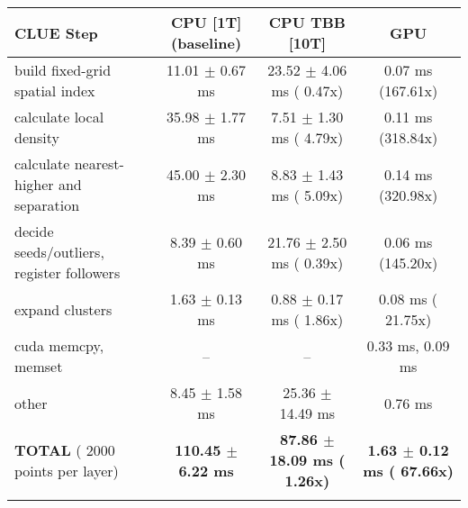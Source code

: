     \begin{tabular}{l|c|c|c}
    \hline
    CLUE Step                                 & CPU [1T] (baseline)         & CPU TBB [10T]                         & GPU                       \\ \hline
    build fixed-grid spatial index            &  11.01 $\pm$  0.67 ms       &  23.52 $\pm$  4.06 ms ( 0.47x)        &   0.07 ms (167.61x)       \\
    calculate local density                   &  35.98 $\pm$  1.77 ms       &   7.51 $\pm$  1.30 ms ( 4.79x)        &   0.11 ms (318.84x)       \\
    calculate nearest-higher and separation   &  45.00 $\pm$  2.30 ms       &   8.83 $\pm$  1.43 ms ( 5.09x)        &   0.14 ms (320.98x)       \\
    decide seeds/outliers, register followers &   8.39 $\pm$  0.60 ms       &  21.76 $\pm$  2.50 ms ( 0.39x)        &   0.06 ms (145.20x)       \\
    expand clusters                           &   1.63 $\pm$  0.13 ms       &   0.88 $\pm$  0.17 ms ( 1.86x)        &   0.08 ms ( 21.75x)       \\ \hline
    cuda memcpy, memset                       & --                          & --                                    &   0.33 ms,   0.09 ms      \\ 
    other                                     &   8.45 $\pm$  1.58 ms       &  25.36 $\pm$ 14.49 ms                 &   0.76 ms                 \\ \hline
    \textbf{TOTAL} ( 2000 points per layer)   & \textbf{110.45 $\pm$  6.22 ms} & \textbf{ 87.86 $\pm$ 18.09 ms ( 1.26x)} & \textbf{  1.63 $\pm$  0.12 ms ( 67.66x)}  \\
    \hline
    \multicolumn{4}{c}{} 
    \end{tabular}
    \linebreak



